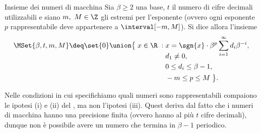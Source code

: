 \begin{definition}
    {Insieme dei numeri di macchina}
    Sia $\beta \geq 2$ una base, $t$ il numero di cifre decimali utilizzabili e siano $m,\ M \in \Z$ gli estremi per l'esponente (ovvero ogni esponente $p$ rappresentabile deve appartenere a $\interval[{-m, M}]$). Si dice allora  l'insieme\[
        \MSet{\beta, t, m, M} \deq \set{0} \union
        \begin{aligned}[t]
            \big\{\; x \in \R \;:\; &x = \sgn{x}\cdot\beta^p\sum_{i=1}^\infty d_i\beta^{-i},\\[-1em]
            &d_1 \neq 0,\\
            &0 \leq d_i \leq \beta-1,\\ 
            &-m \leq p \leq M \;\big\}.
        \end{aligned}
    \] 
\end{definition}

\begin{remark}
    Nelle condizioni in cui specifichiamo quali numeri sono rappresentabili compaiono le ipotesi (i) e (ii) del , ma non l'ipotesi (iii). Quest deriva dal fatto che i numeri di macchina hanno una precisione finita (ovvero hanno al più $t$ cifre decimali), dunque non è possibile avere un numero che termina in $\beta-1$ periodico.
\end{remark}

